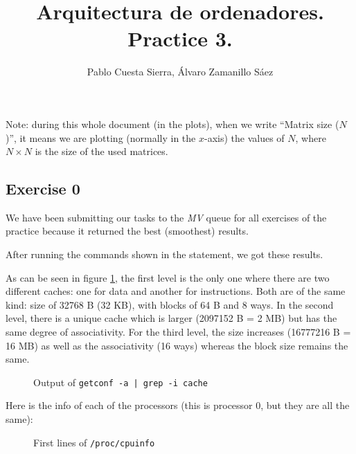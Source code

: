\documentclass{article}
\begin{document}
\title{Arquitectura de ordenadores. Practice 3.}
\author{Pablo Cuesta Sierra, Álvaro Zamanillo Sáez}
\maketitle


Note: during this whole document (in the plots), when we write ``Matrix size ($N$)'', it means we are plotting (normally in the $x$-axis) the values of $N$, where $N\times N$ is the size of the used matrices.

\subsection*{Exercise 0}

We have been submitting our tasks to the \emph{MV} queue for all exercises of the practice because it returned the best (smoothest) results. 

After running the commands shown in the statement, we got these results. 

As can be seen in figure \ref{cache_conf}, the first level is the only one where there are two different caches: one for data and another for instructions. Both are of the same kind: size of 32768 B (32 KB), with blocks of 64 B and 8 ways. 
In the second level, there is a unique cache which is larger (2097152 B = 2 MB) but has the same degree of associativity. For the third level, the size increases (16777216 B = 16 MB) as well as the associativity (16 ways) whereas the block size remains the same.

\begin{figure}[h]
    
    \centering
    \caption{Output of \texttt{getconf -a | grep -i cache}}
    \label{cache_conf}
\end{figure}

\pagebreak

Here is the info of each of the processors (this is processor 0, but they are all the same):

\begin{figure}[h]
    
    \centering
    \caption{First lines of \texttt{/proc/cpuinfo}}
    \label{cpuinfo}
\end{figure}
\end{document}
